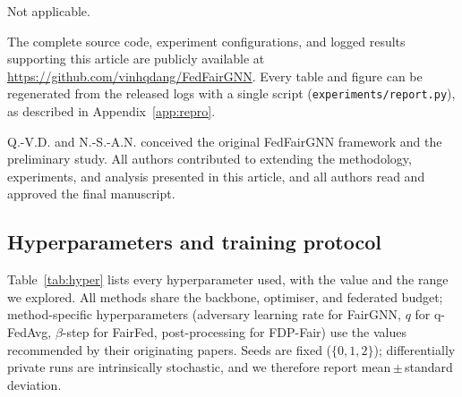 \documentclass[pdflatex,sn-mathphys-num]{sn-jnl}
\theoremstyle{thmstyleone}%
\theoremstyle{thmstyletwo}%
\theoremstyle{thmstylethree}%
\begin{document}
Not applicable.

The complete source code, experiment configurations, and logged results
supporting this article are publicly available at
\url{https://github.com/vinhqdang/FedFairGNN}. Every table and figure can be
regenerated from the released logs with a single script
(\texttt{experiments/report.py}), as described in Appendix~\ref{app:repro}.

Q.-V.D. and N.-S.-A.N. conceived the original FedFairGNN framework and the
preliminary study. All authors contributed to extending the methodology,
experiments, and analysis presented in this article, and all authors read and
approved the final manuscript.

\begin{appendices}

\section{Hyperparameters and training protocol}
\label{app:hyper}
Table~\ref{tab:hyper} lists every hyperparameter used, with the value and the
range we explored. All methods share the backbone, optimiser, and federated
budget; method-specific hyperparameters (adversary learning rate for FairGNN,
$q$ for q-FedAvg, $\beta$-step for FairFed, post-processing for FDP-Fair) use the
values recommended by their originating papers. Seeds are fixed
($\{0,1,2\}$); differentially private runs are intrinsically stochastic, and we
therefore report mean\,$\pm$\,standard deviation.


\end{appendices}
\end{document}
